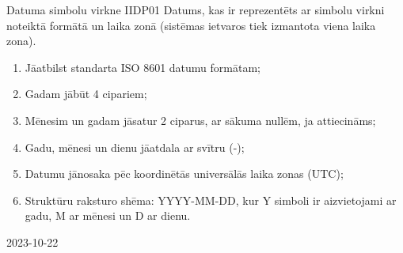 \parameterTable
{Datuma simbolu virkne}
{IIDP01}
{
	Datums, kas ir reprezentēts ar simbolu virkni noteiktā formātā un laika zonā (sistēmas ietvaros tiek izmantota viena laika zona).
}
{
	\begin{enumerate}
		\item Jāatbilst standarta ISO 8601 datumu formātam;
		\item Gadam jābūt 4 cipariem;
		\item Mēnesim un gadam jāsatur 2 ciparus, ar sākuma nullēm, ja attiecināms;
		\item Gadu, mēnesi un dienu jāatdala ar svītru (-);
		\item Datumu jānosaka pēc koordinētās universālās laika zonas (UTC);
		\item Struktūru raksturo shēma: YYYY-MM-DD, kur Y simboli ir aizvietojami ar gadu, M ar mēnesi un D ar dienu.
	\end{enumerate}
}
{
	2023-10-22
}
